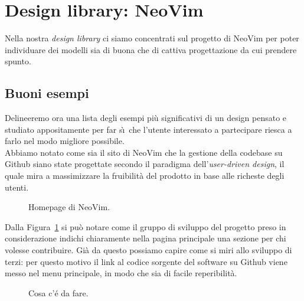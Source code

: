 \documentclass[12pt]{article} %
\begin{document}
\newpage

\section{Design library: NeoVim}
Nella nostra \emph{design library} ci siamo concentrati sul progetto di NeoVim per poter individuare dei modelli sia di buona che di cattiva progettazione da cui prendere spunto.\\

\subsection{Buoni esempi}
Delineeremo ora una lista degli esempi pi\`u significativi di un design pensato e studiato appositamente per far s\`\i\ che l'utente interessato a partecipare riesca a farlo nel modo migliore possibile.\\
Abbiamo notato come sia il sito di NeoVim che la gestione della codebase su Github siano state progettate secondo il paradigma dell'\emph{user-driven design}, il quale mira a massimizzare la fruibilit\`a del prodotto in base alle richeste degli utenti.

\begin{figure}[H]
\caption{Homepage di NeoVim.}
\label{fig:buonesempio1}
\end{figure}

Dalla Figura~\ref{fig:buonesempio1} si pu\`o notare come il gruppo di sviluppo del progetto preso in considerazione indichi chiaramente nella pagina principale una sezione per chi volesse contribuire. Gi\`a da questo possiamo capire come si miri allo sviluppo di terzi: per questo motivo il link al codice sorgente del software su Github viene messo nel menu principale, in modo che sia di facile reperibilit\`a.

\begin{figure}[H]
\caption{Cosa c'\'e da fare.}
\label{fig:buonesempio2}
\end{figure}
\end{document}
